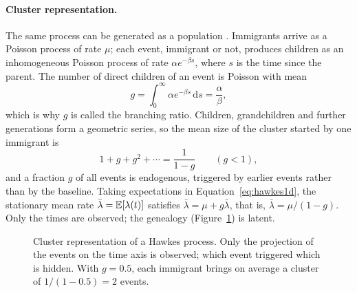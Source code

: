 \paragraph{Cluster representation.} The same process can be generated as a population
\citep{hawkes2018,laub2021}. Immigrants arrive as a Poisson process of rate \(\mu\); each
event, immigrant or not, produces children as an inhomogeneous Poisson process of rate
\(\alpha e^{-\beta s}\), where \(s\) is the time since the parent. The number of direct
children of an event is Poisson with mean
\[
  g=\int_0^\infty\alpha e^{-\beta s}\,\mathrm ds=\frac{\alpha}{\beta},
\]
which is why \(g\) is called the branching ratio. Children, grandchildren and further
generations form a geometric series, so the mean size of the cluster started by one
immigrant is
\[
  1+g+g^2+\cdots=\frac{1}{1-g}\qquad(g<1),
\]
and a fraction \(g\) of all events is endogenous, triggered by earlier events rather than by
the baseline. Taking expectations in Equation~\eqref{eq:hawkes1d}, the stationary mean rate
\(\bar\lambda=\mathbb{E}[\lambda(t)]\) satisfies \(\bar\lambda=\mu+g\bar\lambda\), that is,
\(\bar\lambda=\mu/(1-g)\). Only the times are observed; the genealogy
(Figure~\ref{fig:cluster}) is latent.

\begin{figure}[htbp]
\centering
{}
\caption{Cluster representation of a Hawkes process. Only the projection of the events on
the time axis is observed; which event triggered which is hidden. With \(g=0.5\), each
immigrant brings on average a cluster of \(1/(1-0.5)=2\) events.}
\label{fig:cluster}
\end{figure}

